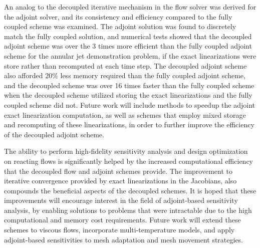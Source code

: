 An analog to the decoupled iterative mechanism in the flow solver was derived
for the adjoint solver, and its consistency and efficiency compared to the fully
coupled scheme was examined.  The adjoint solution was found to discretely match
the fully coupled solution, and numerical tests showed that the decoupled
adjoint scheme was over the 3 times more efficient than the fully coupled
adjoint scheme for the annular jet demonstration problem, if the exact
linearizations were store rather than recomputed at each time step.  The
decoupled adjoint scheme also afforded $20\%$ less memory required than the
fully coupled adjoint scheme, and the decoupled scheme was over 16 times faster
than the fully coupled scheme when the decoupled scheme utilized storing the
exact linearizations and the fully coupled scheme did not.  Future work will
include methods to speedup the adjoint exact linearization computation, as well
as schemes that employ mixed storage and recomputing of these linearizations,
in order to further improve the efficiency of the decoupled adjoint scheme.

The ability to perform high-fidelity sensitivity analysis and design
optimization on reacting flows is significantly helped by the increased
computational efficiency that the decoupled flow and adjoint schemes provide.
The improvement to iterative convergence provided by exact linearizations in the
Jacobians, also compounds the beneficial aspects of the decoupled schemes.  It
is hoped that these improvements will encourage interest in the field of
adjoint-based sensitivity analysis, by enabling solutions to problems that were
intractable due to the high computational and memory cost requirements.
Future work will extend these schemes to viscous flows, incorporate
multi-temperature models, and apply adjoint-based sensitivities to mesh
adaptation and mesh movement strategies.
